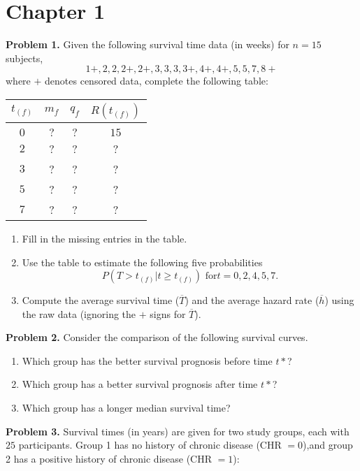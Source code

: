 \documentclass[12pt]{article}
\begin{document}
\section{Chapter 1}



\textbf{Problem 1.}
Given the following survival time data (in weeks) for $n = 15$ subjects,
$$
1+, 2, 2, 2+, 2+, 3, 3, 3, 3+, 4+, 4+, 5, 5, 7, 8+
$$ where $+$ denotes censored data, complete the following table:

\begin{center}
\begin{tabular}{ c c c c }
 $t_{(f)}$ & $m_{f}$ & $q_{f}$ & $R(t_{(f)})$ \\
 \hline \\
 $0$ & $?$ & $?$ & $15$ \\
 $2$ &?  &?  &? \\
 $3$ &?  &?  &? \\
 $5$ &?  &?  &? \\
 $7$ &?  &?  &?
\end{tabular}
\end{center}

\begin{enumerate}
\item Fill in the missing entries in the table.
\item Use the table to estimate the following five probabilities
\[
P(T>t_{(f)}|t \ge t_{(f)}) \text{ for} t=0,2,4,5,7.
\]
\item Compute the average survival time ($\overline{T}$) and the average hazard rate ($\overline{h}$) using the raw data (ignoring the $+$ signs for $\overline{T}$).
\end{enumerate}



\textbf{Problem 2.}
Consider the comparison of the following survival curves.
\vspace{30pt}
\begin{enumerate}
\item Which group has the better survival prognosis before time $t*$?
\item Which group has a better survival prognosis after time $t*$?
\item Which group has a longer median survival time?
\end{enumerate}





\textbf{Problem 3.}
Survival times (in years) are given for two study groups, each with $25$ participants. Group 1 has no history of chronic disease (CHR $= 0$),and group 2 has a positive history of chronic disease (CHR $= 1$): \\
\end{document}
